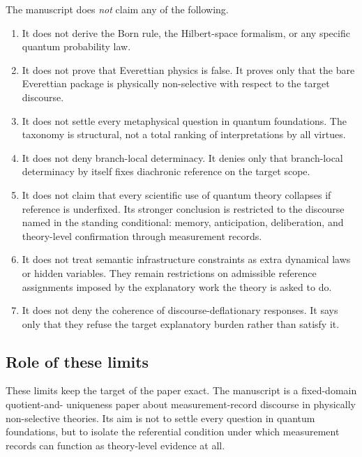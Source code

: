 The manuscript does \emph{not} claim any of the following.
\begin{enumerate}
    \item It does not derive the Born rule, the Hilbert-space formalism, or any specific quantum
    probability law.
    \item It does not prove that Everettian physics is false. It proves only that the bare Everettian
    package is physically non-selective with respect to the target discourse.
    \item It does not settle every metaphysical question in quantum foundations. The taxonomy is
    structural, not a total ranking of interpretations by all virtues.
    \item It does not deny branch-local determinacy. It denies only that branch-local determinacy by
    itself fixes diachronic reference on the target scope.
    \item It does not claim that every scientific use of quantum theory collapses if reference is
    underfixed. Its stronger conclusion is restricted to the discourse named in the standing
    conditional: memory, anticipation, deliberation, and theory-level confirmation through
    measurement records.
    \item It does not treat semantic infrastructure constraints as extra dynamical laws or hidden
    variables. They remain restrictions on admissible reference assignments imposed by the
    explanatory work the theory is asked to do.
    \item It does not deny the coherence of discourse-deflationary responses. It says only that they
    refuse the target explanatory burden rather than satisfy it.
\end{enumerate}

\subsection{Role of these limits}

These limits keep the target of the paper exact. The manuscript is a fixed-domain quotient-and-
uniqueness paper about measurement-record discourse in physically non-selective theories. Its aim is
not to settle every question in quantum foundations, but to isolate the referential condition under
which measurement records can function as theory-level evidence at all.

